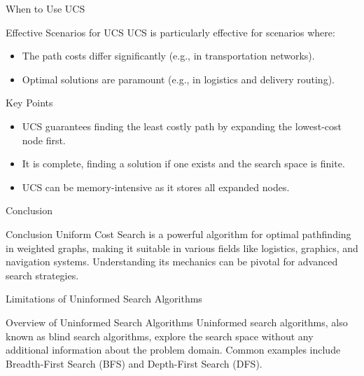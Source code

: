 \documentclass[aspectratio=169]{beamer}
\begin{document}
\begin{frame}[fragile]{When to Use UCS}
  \begin{block}{Effective Scenarios for UCS}
    UCS is particularly effective for scenarios where:
    \begin{itemize}
      \item The path costs differ significantly (e.g., in transportation networks).
      \item Optimal solutions are paramount (e.g., in logistics and delivery routing).
    \end{itemize}
  \end{block}

  \begin{block}{Key Points}
    \begin{itemize}
      \item UCS guarantees finding the least costly path by expanding the lowest-cost node first.
      \item It is complete, finding a solution if one exists and the search space is finite.
      \item UCS can be memory-intensive as it stores all expanded nodes.
    \end{itemize}
  \end{block}
\end{frame}

\begin{frame}[fragile]{Conclusion}
  \begin{block}{Conclusion}
    Uniform Cost Search is a powerful algorithm for optimal pathfinding in weighted graphs, making it suitable in various fields like logistics, graphics, and navigation systems. Understanding its mechanics can be pivotal for advanced search strategies.
  \end{block}
\end{frame}

\begin{frame}[fragile]{Limitations of Uninformed Search Algorithms}
    \begin{block}{Overview of Uninformed Search Algorithms}
        Uninformed search algorithms, also known as blind search algorithms, explore the search space without any additional information about the problem domain. Common examples include Breadth-First Search (BFS) and Depth-First Search (DFS).
    \end{block}
\end{frame}
\end{document}
